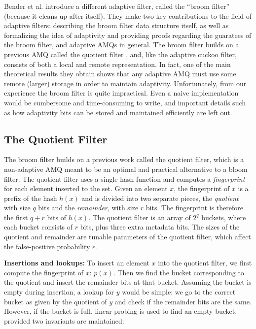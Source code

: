 \documentclass[../paper.tex]{subfiles}
\begin{document}
 Bender et al. \cite{broom-filter} introduce a different adaptive filter, called the ``broom filter''
(because it cleans up after itself). They make two key contributions to the
field of adaptive filters: describing the broom filter data structure itself,
as well as formalizing the idea of adaptivity and providing proofs regarding the guaratees
of the broom filter, and adaptive AMQs in general. The broom filter builds on
a previous AMQ called the quotient filter \cite{quotient-filter}, and, like the adaptive
cuckoo filter, consists of both a local and remote representation. In fact, one
of the main theoretical results they obtain shows that any adaptive AMQ must use
some remote (larger) storage in order to maintain adaptivity. Unfortunately, from
our experience the broom filter is quite impractical. Even a naive implementation
would be cumbersome and time-consuming to write, and important details such as
how adaptivity bits can be stored and maintained efficiently are left out.

\subsection{The Quotient Filter}

The broom filter builds on a previous work called the quotient filter, which
is a non-adaptive AMQ meant to be an optimal and practical alternative to a bloom filter.
The quotient filter uses a single hash function and computes a \textit{fingerprint} for
each element inserted to the set. Given an element $x$, the fingerprint of $x$ is a
prefix of the hash $h(x)$ and is divided into two separate pieces, the \textit{quotient} with
size $q$ bits and the \textit{remainder}, with size $r$ bits. The fingerprint is therefore
the first $q+r$ bits of $h(x)$.
The quotient filter is an array of $2^q$ buckets, where
each bucket consists of $r$ bits, plus three extra metadata bits.
The sizes of the quotient and remainder are tunable
parameters of the quotient filter, which affect the false-positive probability $\epsilon$.

\textbf{Insertions and lookups:} To insert an element $x$ into the quotient filter, we first
compute the fingerprint of $x$: $p(x)$. Then we find the bucket corresponding
to the quotient and insert the remainder bits at that bucket. Assuming the bucket
is empty during insertion, a lookup for $y$ would be simple: we go to the correct bucket as given
by the quotient of $y$ and check if the remainder bits are the same. However, if the bucket is
full, linear probing is used to find an empty bucket, provided two invariants are maintained:
\end{document}
